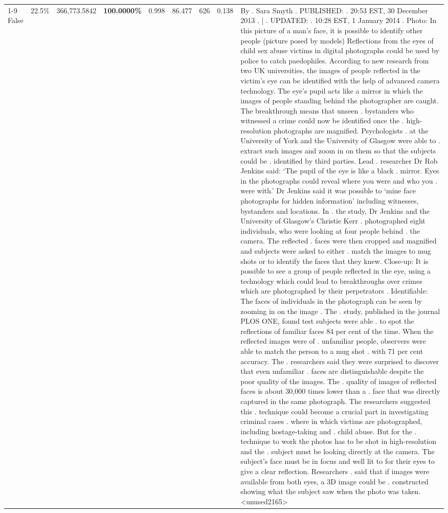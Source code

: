 \begin{table}[H]
\begin{tabular}{lllrlllll}
\cline{1-9} \cline{2-9}
False & 22.5\% & 366,773.5842 & \bfseries \color{red} 100.0000\% & 0.998 & 86.477 & 626 & 0.138 & By . Sara Smyth . PUBLISHED: . 20:53 EST, 30 December 2013 . | . UPDATED: . 10:28 EST, 1 January 2014 . Photo: In this picture of a man's face, it is possible to identify other people (picture posed by models) Reflections from the eyes of child sex abuse victims in digital photographs could be used by police to catch paedophiles. According to new research from two UK universities, the images of people reflected in the victim's eye can be identified with the help of advanced camera technology. The eye's pupil acts like a mirror in which the images of people standing behind the photographer are caught. The breakthrough means that unseen . bystanders who witnessed a crime could now be identified once the . high-resolution photographs are magnified. Psychologists . at the University of York and the University of Glasgow were able to . extract such images and zoom in on them so that the subjects could be . identified by third parties. Lead . researcher Dr Rob Jenkins said: ‘The pupil of the eye is like a black . mirror. Eyes in the photographs could reveal where you were and who you . were with.' Dr Jenkins said it was possible to ‘mine face photographs for hidden information' including witnesses, bystanders and locations. In . the study, Dr Jenkins and the University of Glasgow's Christie Kerr . photographed eight individuals, who were looking at four people behind . the camera. The reflected . faces were then cropped and magnified and subjects were asked to either . match the images to mug shots or to identify the faces that they knew. Close-up: It is possible to see a group of people reflected in the eye, using a technology which could lead to breakthroughs over crimes which are photographed by their perpetrators . Identifiable: The faces of individuals in the photograph can be seen by zooming in on the image . The . study, published in the journal PLOS ONE, found test subjects were able . to spot the reflections of familiar faces 84 per cent of the time. When the reflected images were of . unfamiliar people, observers were able to match the person to a mug shot . with 71 per cent accuracy. The . researchers said they were surprised to discover that even unfamiliar . faces are distinguishable despite the poor quality of the images. The . quality of images of reflected faces is about 30,000 times lower than a . face that was directly captured in the same photograph. The researchers suggested this . technique could become a crucial part in investigating criminal cases . where in which victims are photographed, including hostage-taking and . child abuse. But for the . technique to work the photos has to be shot in high-resolution and the . subject must be looking directly at the camera. The subject's face must be in focus and well lit to for their eyes to give a clear reflection. Researchers . said that if images were available from both eyes, a 3D image could be . constructed showing what the subject saw when the photo was taken.<unused2165> \\

\end{tabular}
\end{table}
